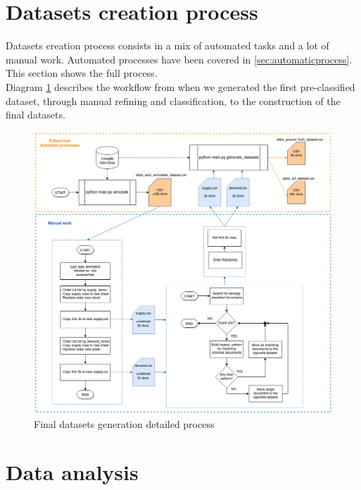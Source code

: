 \section{Datasets creation process}
\label{sec:datasetscreation}

Datasets creation process consists in a mix of automated tasks and a lot of manual work. Automated processes have been covered in \autoref{sec:automaticprocess}. This section shows the full process.\\
Diagram \ref{fig:datasets_full_process} describes the workflow from when we generated the first pre-classified dataset, through manual refining and classification, to the construction of the final datasets.

\begin{figure}[H]
	\centering
	\includegraphics[width=1.0\textwidth]{figs/datasets_full_process.png}
	\caption{Final datasets generation detailed process}
	\label{fig:datasets_full_process}
\end{figure}

\section{Data analysis}
\label{sec:dataanalysis}

